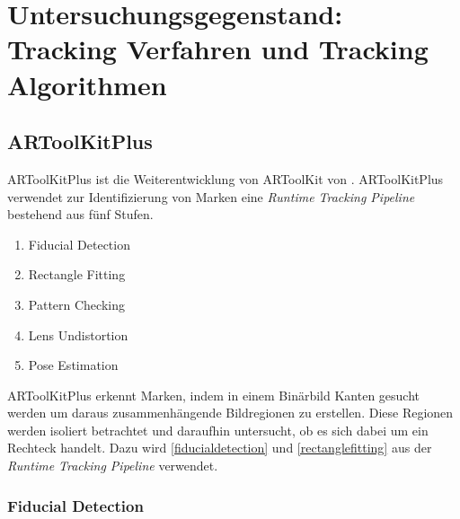 \section{Untersuchungsgegenstand: Tracking Verfahren und Tracking Algorithmen} %
\label{sec:untersuchungsgegenstand}
\begin{comment}
	Untersuchungsgegenstand: Verfahren und Algorithmen präzise vorstellen und ihre Unterschiede hervorheben.
	Notwendige Kriterien der Algorithmen bestimmen

	Grober Ablauf der Verfahren:
	* Wer hats erfunden?
	* Wie ist das Verfahren aufgebaut (Algo in grob)
	* Welche Kriterien müssen erfüllt sein (monochrom, rgb eingabe)?
\end{comment}

\subsection{ARToolKitPlus} %
\label{sub:artoolkitplus}

ARToolKitPlus ist die Weiterentwicklung von ARToolKit von \citeauthor{wagner07b}. ARToolKitPlus verwendet zur
Identifizierung von Marken eine \textit{Runtime Tracking Pipeline} bestehend aus fünf Stufen.

\begin{enumerate}
	\item Fiducial Detection \label{fiducialdetection}
	\item Rectangle Fitting \label{rectanglefitting}
	\item Pattern Checking
	\item Lens Undistortion
	\item Pose Estimation
\end{enumerate}

ARToolKitPlus erkennt Marken, indem in einem Binärbild Kanten gesucht werden um daraus zusammenhängende Bildregionen
 zu erstellen. Diese Regionen werden isoliert betrachtet und daraufhin untersucht, ob es sich dabei um ein Rechteck
 handelt. Dazu wird \autoref{fiducialdetection} und \autoref{rectanglefitting} aus der
 \textit{Runtime Tracking Pipeline} verwendet.


\subsubsection{Fiducial Detection} %
\label{sub:fiducial_detection}

